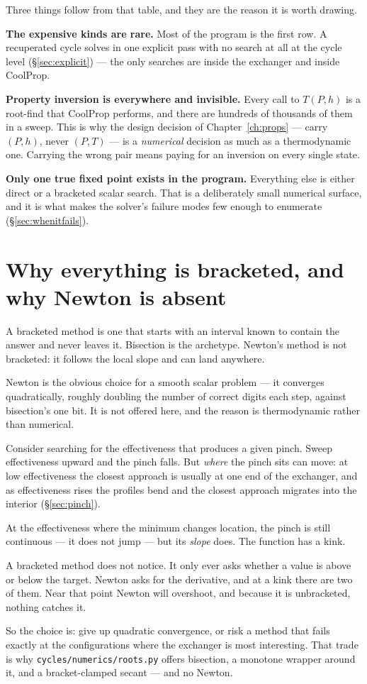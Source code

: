 \documentclass[11pt,a4paper]{report}
\newcommand{\code}[1]{\texttt{\small #1}}
\begin{document}
Three things follow from that table, and they are the reason it is worth
drawing.

\textbf{The expensive kinds are rare.} Most of the program is the first row.
A recuperated cycle solves in one explicit pass with no search at all at
the cycle level (\S\ref{sec:explicit}) --- the only searches are inside the
exchanger and inside CoolProp.

\textbf{Property inversion is everywhere and invisible.} Every call to
$T(P,h)$ is a root-find that CoolProp performs, and there are hundreds of
thousands of them in a sweep. This is why the design decision of
Chapter~\ref{ch:props} --- carry $(P,h)$, never $(P,T)$ --- is a
\emph{numerical} decision as much as a thermodynamic one. Carrying the
wrong pair means paying for an inversion on every single state.

\textbf{Only one true fixed point exists in the program.} Everything else is
either direct or a bracketed scalar search. That is a deliberately small
numerical surface, and it is what makes the solver's failure modes few
enough to enumerate (\S\ref{sec:whenitfails}).

\section{Why everything is bracketed, and why Newton is absent}

A bracketed method is one that starts with an interval known to contain
the answer and never leaves it. Bisection is the archetype. Newton's
method is not bracketed: it follows the local slope and can land anywhere.

Newton is the obvious choice for a smooth scalar problem --- it converges
quadratically, roughly doubling the number of correct digits each step,
against bisection's one bit. It is not offered here, and the reason is
thermodynamic rather than numerical.

\begin{choicebox}[title={Why the pinch has a kink in it}]
Consider searching for the effectiveness that produces a given pinch.
Sweep effectiveness upward and the pinch falls. But \emph{where} the pinch
sits can move: at low effectiveness the closest approach is usually at one
end of the exchanger, and as effectiveness rises the profiles bend and the
closest approach migrates into the interior (\S\ref{sec:pinch}).

At the effectiveness where the minimum changes location, the pinch is
still continuous --- it does not jump --- but its \emph{slope} does. The
function has a kink.

A bracketed method does not notice. It only ever asks whether a value is
above or below the target. Newton asks for the derivative, and at a kink
there are two of them. Near that point Newton will overshoot, and because
it is unbracketed, nothing catches it.

So the choice is: give up quadratic convergence, or risk a method that
fails exactly at the configurations where the exchanger is most
interesting. That trade is why \code{cycles/numerics/roots.py} offers
bisection, a monotone wrapper around it, and a bracket-clamped secant ---
and no Newton.
\end{choicebox}
\end{document}
